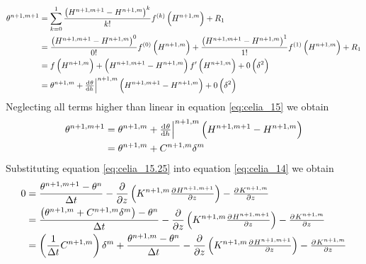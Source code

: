\begin{align}
  \theta^{n+1,m+1} &= \sum_{k=0}^1\frac{\del{ H^{n+1,m+1} - H^{n+1,m} }^k}{k!}f^{\del{ k }}\del{ H^{n+1,m} } + R_1 \\
                   &= \frac{\del{ H^{n+1,m+1} - H^{n+1,m} }^0}{0!} f^{\del{ 0 }}\del{ H^{n+1,m} } + \frac{\del{ H^{n+1,m+1} - H^{n+1,m} }^1}{1!} f^{\del{ 1 }}\del{ H^{n+1,m} } + R_1 \\
                   &= f\del{ H^{n+1,m} } + \del{ H^{n+1,m+1} - H^{n+1,m} } f'\del{ H^{n+1,m} } + 0 \del{ \delta^2 } \\
  \label{eq:celia_15}
                   &= \theta^{n+1,m} + \evalat{\od{\theta}{h}}{n+1,m} \del{ H^{n+1,m+1} - H^{n+1,m} } + 0 \del{ \delta^2 }
\end{align}
Neglecting all terms higher than linear in equation \eqref{eq:celia_15}  we obtain
\begin{align}
  \theta^{n+1,m+1} &= \theta^{n+1,m} + \evalat{\od{\theta}{h}}{n+1,m} \del{ H^{n+1,m+1} - H^{n+1,m} } \\
  \label{eq:celia_15.25}
                   &= \theta^{n+1,m} + C^{n+1,m} \delta^m
\end{align}
Substituting equation \eqref{eq:celia_15.25} into equation \eqref{eq:celia_14} we obtain
\begin{align}
  0 &= \frac{\theta^{n+1,m+1} - \theta^n}{\Delta t} - \frac{\partial}{\partial z} \del{ K^{n+1,m}\pd{H^{n+1,m+1}}{z} } - \pd{K^{n+1,m}}{z} \\
    &= \frac{\del{\theta^{n+1,m} + C^{n+1,m} \delta^m} - \theta^n}{\Delta t} - \frac{\partial}{\partial z} \del{ K^{n+1,m}\pd{H^{n+1,m+1}}{z} } - \pd{K^{n+1,m}}{z} \\
  \label{eq:celia_15.5}
  &= \del{\frac{1}{\Delta t} C^{n+1,m}} \delta^m + \frac{\theta^{n+1,m}  - \theta^n}{\Delta t} - \frac{\partial}{\partial z} \del{ K^{n+1,m}\pd{H^{n+1,m+1}}{z} } - \pd{K^{n+1,m}}{z}
\end{align}

